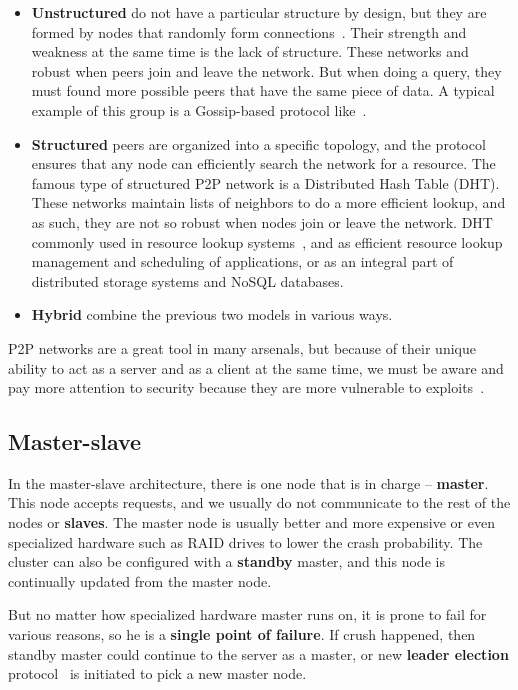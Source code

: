 \begin{itemize}
	\item \textbf{Unstructured} do not have a particular structure by design, but they are formed by nodes that randomly form connections~\cite{FilaliBHB11}. Their strength and weakness at the same time is the lack of structure. These networks and robust when peers join and leave the network. But when doing a query, they must found more possible peers that have the same piece of data. A typical example of this group is a Gossip-based protocol like~\cite{DasGM02}.
	\item \textbf{Structured} peers are organized into a specific topology, and the protocol ensures that any node can efficiently search the network for a resource. The famous type of structured P2P network is a Distributed Hash Table (DHT). These networks maintain lists of neighbors to do a more efficient lookup, and as such, they are not so robust when nodes join or leave the network. DHT commonly used in resource lookup systems~\cite{StoicaMKKB01}, and as efficient resource lookup management and scheduling of applications, or as an integral part of distributed storage systems and NoSQL\cite{Leavitt10} databases.
	\item \textbf{Hybrid} combine the previous two models in various ways.
\end{itemize}

P2P networks are a great tool in many arsenals, but because of their unique ability to act as a server and as a client at the same time, we must be aware and pay more attention to security because they are more vulnerable to exploits~\cite{0024003}.
%
%
\subsection{Master-slave}\label{sec:master_slave}
%
In the master-slave architecture, there is one node that is in charge -- \textbf{master}. This node accepts requests, and we usually do not communicate to the rest of the nodes or \textbf{slaves}. The master node is usually better and more expensive or even specialized hardware such as RAID drives to lower the crash probability. The cluster can also be configured with a \textbf{standby} master, and this node is continually updated from the master node.

But no matter how specialized hardware master runs on, it is prone to fail for various reasons, so he is a \textbf{single point of failure}. If crush happened, then standby master could continue to the server as a master, or new \textbf{leader election} protocol~\cite{KorachKM90} is initiated to pick a new master node. 

